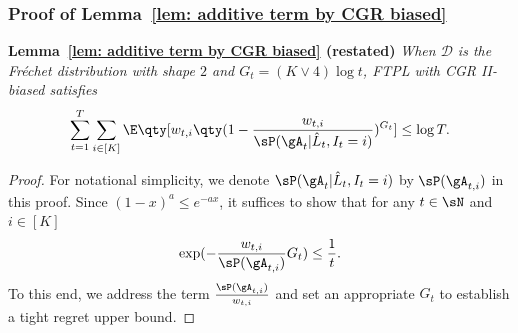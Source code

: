 \subsubsection{Proof of Lemma~\ref{lem: additive term by CGR biased}}\label{subsection: B2}
\textbf{Lemma~\ref{lem: additive term by CGR biased} (restated)} 
\textit{When $\mathcal{D}$ is the Fr\'{e}chet distribution with shape $2$ and $G_t=(K\lor 4)\log t$, FTPL with CGR II-biased satisfies}
\begin{equation*}
    \sum_{t=1}^T \sum_{i\in [K]}\E\qty[w_{t,i} \qty(1-\frac{w_{t,i}}{\sP(\gA_{t}|\hat{L}_t, I_t=i)})^{G_t}] \leq \log T.
\end{equation*}
\begin{proof}
    For notational simplicity, we denote $\sP(\gA_{t}|\hat{L}_t, I_t=i)$ by $\sP(\gA_{t,i})$ in this proof.
    Since $(1-x)^a \leq e^{-ax}$, it suffices to show that for any $t \in \sN$ and $i \in [K]$
    \begin{equation*}
       \exp(-\frac{w_{t,i}}{\sP(\gA_{t,i})}G_t) \leq \frac{1}{t}.
    \end{equation*}
To this end, we
address the term $\frac{\sP(\gA_{t,i})}{w_{t,i}}$ and set an appropriate $G_t$ to establish a tight regret upper bound.


\end{proof}
